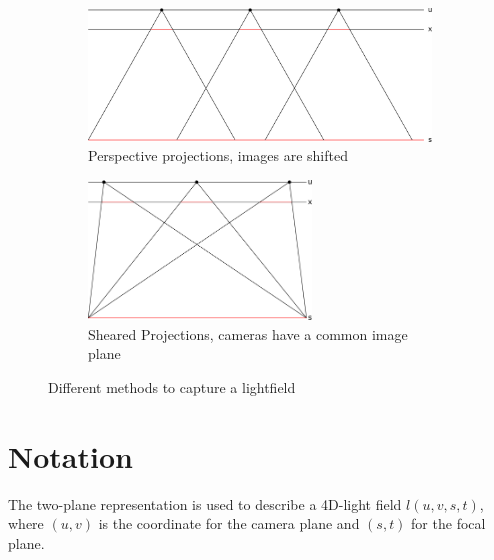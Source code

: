 \documentclass[11pt,a4paper,titlepage]{article}
\begin{document}
\begin{figure}
	\centering
	\begin{subfigure}[b]{0.4\textwidth}
 		\includegraphics[width=\textwidth]{sketches/perspective_shifted_projections.png}
  		\caption{Perspective projections, images are shifted}
   		\label{fig:perspective_shifted_projections}
	\end{subfigure}%
	\qquad
	\begin{subfigure}[b]{0.4\textwidth}
		\includegraphics[width=0.65\textwidth]{sketches/sheared_projections.png}
		\caption{Sheared Projections, cameras have a common image plane}
		\label{fig:sheared_projections}
	\end{subfigure}
	\caption{Different methods to capture a lightfield}
\end{figure}

\section{Notation}

The two-plane representation is used to describe a 4D-light field $l\left( u, v, s, t \right)$, where $\left( u, v \right)$ is the coordinate for the camera plane and $\left( s, t \right)$ for the focal plane. 
\end{document}
